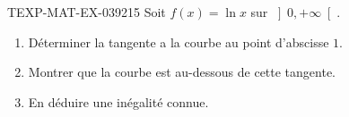 \begin{exercice}{TEXP-MAT-EX-039}{2}{15}
Soit $f(x) = \ln x$ sur $\left]0, +\infty\right[$.
\begin{enumerate}
  \item Déterminer la tangente a la courbe au point d'abscisse $1$.
  \item Montrer que la courbe est au-dessous de cette tangente.
  \item En déduire une inégalité connue.
\end{enumerate}

\end{exercice}
